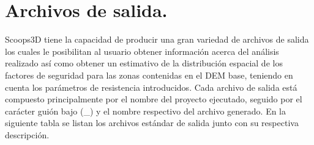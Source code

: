 	\section{Archivos de salida.}
\label{chap: archivos de salida}
Scoops3D tiene la capacidad de producir una gran variedad de archivos de salida los
cuales le posibilitan al usuario obtener informaci\'{o}n acerca del an\'alisis realizado as\'{i} como
obtener un estimativo de la distribuci\'{o}n espacial de los factores de seguridad para las zonas
contenidas en el DEM base, teniendo en cuenta los par\'{a}metros de resistencia introducidos.
Cada archivo de salida est\'{a} compuesto principalmente por el nombre del proyecto ejecutado, seguido por el car\'{a}cter gui\'{o}n bajo (\_) y el nombre respectivo del archivo generado.
En la siguiente tabla se listan los archivos est\'{a}ndar de salida junto con su respectiva descripci\'{o}n.


